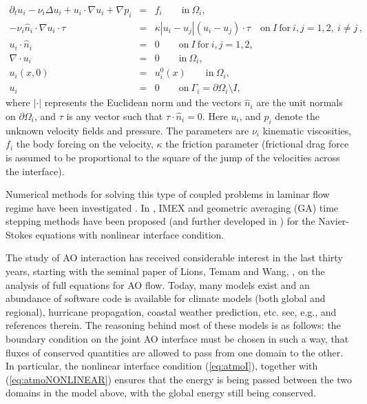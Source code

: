 \documentclass[10pt]{article}%
\numberwithin{equation}{section}
\begin{document}
\begin{eqnarray}
\partial_{t}u_i -\nu_i\Delta u_i+u_i \cdot \nabla u_i + \nabla p_i &=&  f_i \qquad \mathrm{in}\ \Omega_i, \label{eq:atmo} \\
-\nu_i \hat{n}_i  \cdot \nabla u_i \cdot \tau &=& \kappa |u_i - u_j|( u_i - u_j )\cdot \tau \quad \mathrm{on}  \ I \ \mathrm{for} \ i,j = 1,2, \ i \neq j \,  , \label{eq:atmoI}\\
u_i \cdot \hat{n}_i  &=&0 \qquad \mathrm{on} \ I \ \mathrm{for} \ i,j = 1,2, \label{eq:atmoNONLINEAR}\\
\nabla \cdot u_i &=&0 \qquad  \mathrm{ in } \ \Omega_i,  \label{eq:atmoNONLINEAR1}\\
u_i(x,0)&=&u_i^0(x) \qquad\mathrm{ in }\ \Omega_i , \label{eq:atmoIC}\\
u_i&=&0 \qquad\mathrm{ on } \ \Gamma_i = \partial\Omega_i\setminus I , \label{eq:atmoBC}
\end{eqnarray}
where $|\cdot|$ represents the Euclidean norm and the vectors $\hat{n}_i$ are the unit normals on $\partial \Omega_i$, and $\tau$ is any vector such that $\tau\cdot\hat{n}_i=0$. Here $u_i$, and $p_i$ denote the unknown velocity fields and pressure. The parameters are $\nu_i$ kinematic viscosities, $f_i$ the body forcing on the velocity, $\kappa$ the friction parameter (frictional drag force is assumed to be proportional to the square of the jump of the velocities across the interface).

Numerical methods for solving this type of coupled problems in laminar flow regime have been investigated \cite{BK06,CHL12,ZHS16, ACEL18}. In \cite{CHL12}, IMEX and geometric averaging (GA) time stepping methods have been proposed (and further developed in \cite{ACEL18}) for the Navier-Stokes equations with nonlinear interface condition.

The study of AO interaction has received considerable interest in the last thirty years, starting with the seminal paper of Lions, Temam and Wang, \cite{LTW1,LTW2}, on the analysis of full equations for AO flow. Today, many models exist and an abundance of software code is available for climate models (both global and regional), hurricane propagation, coastal weather prediction, etc. see, e.g., \cite{BWCK00, BKLG96, PSSB07} and references therein. The reasoning behind most of these models is as follows: the boundary condition on the joint AO interface must be chosen in such a way, that fluxes of conserved quantities are allowed to pass from one domain to the other. In particular, the nonlinear interface condition (\ref{eq:atmoI}), together with
(\ref{eq:atmoNONLINEAR}) ensures that the energy is being passed between the two domains in the model above, with the global energy still being conserved.
\end{document}
